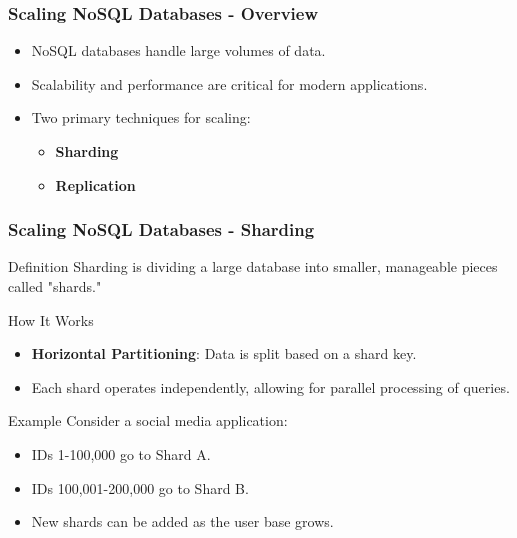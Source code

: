 \documentclass[aspectratio=169]{beamer}
\begin{document}
\begin{frame}[fragile]
    \frametitle{Scaling NoSQL Databases - Overview}
    \begin{itemize}
        \item NoSQL databases handle large volumes of data.
        \item Scalability and performance are critical for modern applications.
        \item Two primary techniques for scaling:
        \begin{itemize}
            \item \textbf{Sharding}
            \item \textbf{Replication}
        \end{itemize}
    \end{itemize}
\end{frame}

\begin{frame}[fragile]
    \frametitle{Scaling NoSQL Databases - Sharding}
    \begin{block}{Definition}
        Sharding is dividing a large database into smaller, manageable pieces called "shards."
    \end{block}
    
    \begin{block}{How It Works}
        \begin{itemize}
            \item \textbf{Horizontal Partitioning}: Data is split based on a shard key.
            \item Each shard operates independently, allowing for parallel processing of queries.
        \end{itemize}
    \end{block}
    
    \begin{block}{Example}
        Consider a social media application:
        \begin{itemize}
            \item IDs 1-100,000 go to Shard A.
            \item IDs 100,001-200,000 go to Shard B.
            \item New shards can be added as the user base grows.
        \end{itemize}
    \end{block}
\end{frame}
\end{document}
